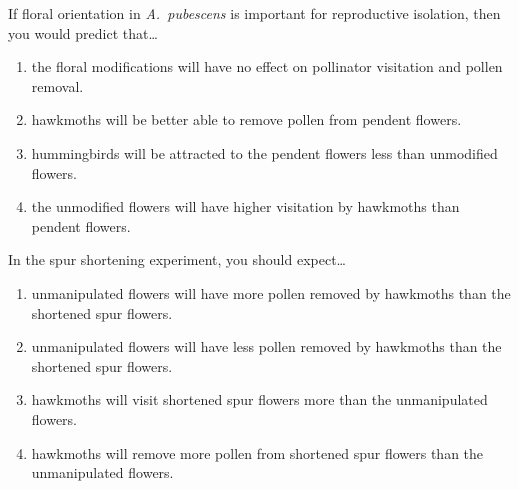 \documentclass[t,handout]{beamer}  %
\newcommand{\ques}[1]{\highlight{\textsc{q#1:}}}
\begin{document}
%
\begin{frame}[t]{\ques9 If floral orientation in \textit{A.~pubescens} is important for reproductive isolation, then you would predict that\dots}
	
	
	\begin{enumerate}
		\item the floral modifications will have no effect on pollinator visitation and pollen removal.
		\item hawkmoths will be better able to remove pollen from pendent flowers.
		\item hummingbirds will be attracted to the pendent flowers less than unmodified flowers.
		\item \alert<2>{the unmodified flowers will have higher visitation by hawkmoths than pendent flowers.}
	\end{enumerate}
\end{frame}
%
\begin{frame}[t]{\ques{10} In the spur shortening experiment, you should expect\dots}
	\begin{enumerate}
		\item \alert<2>{unmanipulated flowers will have more pollen removed by hawkmoths than the shortened spur flowers.}
		\item unmanipulated  flowers will have less pollen removed by hawkmoths than the shortened spur flowers.
		\item hawkmoths will visit shortened spur flowers more than the unmanipulated flowers.
		\item hawkmoths will remove more pollen from shortened spur flowers than the unmanipulated flowers.
	\end{enumerate}

\end{frame}
%
\end{document}

